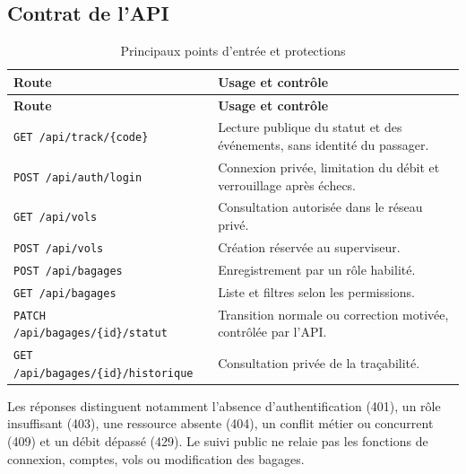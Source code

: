 \documentclass[11pt]{extarticle}
\begin{document}
\subsection{Contrat de l'API}
\begin{longtable}{p{5.5cm}p{8cm}}
\caption{Principaux points d'entrée et protections}\\\toprule
\textbf{Route} & \textbf{Usage et contrôle}\\\midrule\endfirsthead
\toprule\textbf{Route} & \textbf{Usage et contrôle}\\\midrule\endhead
\texttt{GET /api/track/\{code\}} & Lecture publique du statut et des événements, sans identité du passager.\\
\texttt{POST /api/auth/login} & Connexion privée, limitation du débit et verrouillage après échecs.\\
\texttt{GET /api/vols} & Consultation autorisée dans le réseau privé.\\
\texttt{POST /api/vols} & Création réservée au superviseur.\\
\texttt{POST /api/bagages} & Enregistrement par un rôle habilité.\\
\texttt{GET /api/bagages} & Liste et filtres selon les permissions.\\
{\footnotesize\texttt{PATCH /api/bagages/\{id\}/statut}} & Transition normale ou correction motivée, contrôlée par l'API.\\
{\scriptsize\texttt{GET /api/bagages/\{id\}/historique}} & Consultation privée de la traçabilité.\\\bottomrule
\end{longtable}
Les réponses distinguent notamment l'absence d'authentification (401), un rôle insuffisant (403), une ressource absente (404), un conflit métier ou concurrent (409) et un débit dépassé (429). Le suivi public ne relaie pas les fonctions de connexion, comptes, vols ou modification des bagages.
\end{document}
